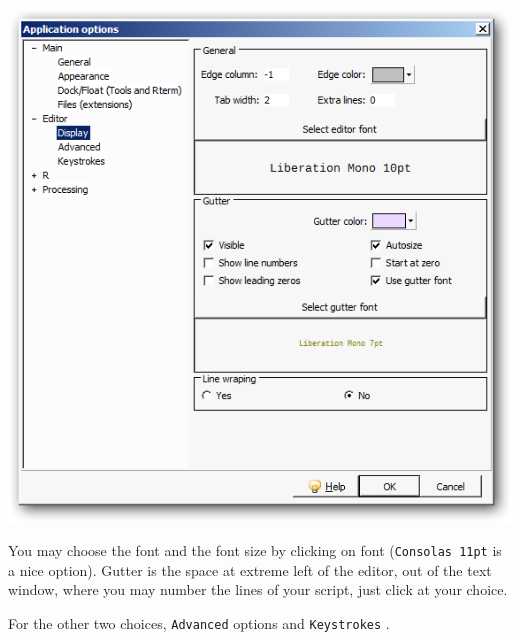 \includegraphics[scale=0.50]{./res/app_editor_display.png}

You may choose the font and the font size by clicking on font (\texttt{Consolas 11pt} is a nice option).
Gutter is the space at extreme left of the editor, out of the text window,
where you may number the lines of your script, just click at your choice.

For the other two choices, \texttt{Advanced} options and
\texttt{Keystrokes} \textit{}.

